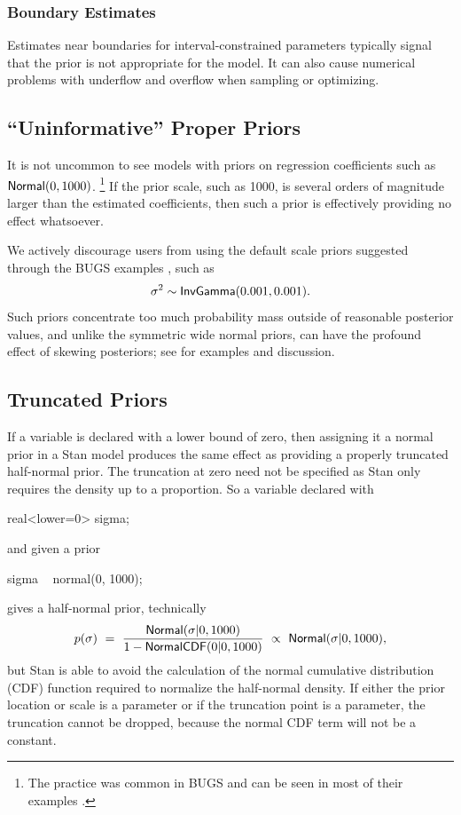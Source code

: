 \subsubsection{Boundary Estimates}

Estimates near boundaries for interval-constrained parameters
typically signal that the prior is not appropriate for the model.  It
can also cause numerical problems with underflow and overflow when
sampling or optimizing.

\subsection{``Uninformative'' Proper Priors}

It is not uncommon to see models with priors on regression
coefficients such as $\distro{Normal}(0,1000)$.%
%
\footnote{The practice was common in BUGS and can be seen in most of
  their examples \cite{LunnEtAl:2012}.}
%
If the prior scale, such as 1000, is several orders of magnitude
larger than the estimated coefficients, then such a prior is
effectively providing no effect whatsoever.  

We actively discourage users from using the default scale priors
suggested through the BUGS examples \citep{LunnEtAl:2012}, such as
\[
\sigma^2 \sim \distro{InvGamma}(0.001, 0.001).
\]
%
Such priors concentrate too much probability mass outside of
reasonable posterior values, and unlike the symmetric wide normal
priors, can have the profound effect of skewing posteriors; see
\citep{Gelman:2006} for examples and discussion.

\subsection{Truncated Priors}

If a variable is declared with a lower bound of zero, then assigning
it a normal prior in a Stan model produces the same effect as
providing a properly truncated half-normal prior.  The truncation at
zero need not be specified as Stan only requires the density up to a
proportion.  So a variable declared with
%
\begin{stancode}
real<lower=0> sigma;
\end{stancode}
%
and given a prior
\begin{stancode}
sigma ~ normal(0, 1000);
\end{stancode}
%
gives  a half-normal prior, technically
%
\[
p(\sigma) 
\ = \
\frac{\distro{Normal}(\sigma|0,1000)}
     {1 - \distro{NormalCDF}(0|0,1000)}
\ \propto \
\distro{Normal}(\sigma|0,1000),
\]
%
but Stan is able to avoid the calculation of the normal cumulative
distribution (CDF) function required to normalize the half-normal density.
If either the prior location or scale is a parameter or if the
truncation point is a parameter, the truncation cannot be dropped,
because the normal CDF term will not be a constant.


